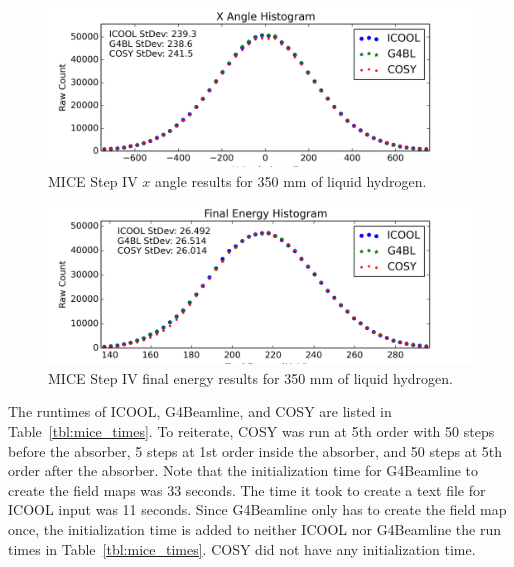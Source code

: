 \documentclass[a4paper,11pt]{article}
\begin{document}
\begin{figure}[htb]
  \centering
    \includegraphics[width=\columnwidth]{Figures/px} 
  \caption{MICE Step IV $x$ angle results for 350 mm of liquid hydrogen.}
  \label{fig:micexangle}
\end{figure}

\begin{figure}[htb]
  \centering
    \includegraphics[width=\columnwidth]{Figures/e} 
  \caption{MICE Step IV final energy results for 350 mm of liquid hydrogen.}
  \label{fig:miceenergy}
\end{figure}

The runtimes of ICOOL, G4Beamline, and COSY are listed in Table~\ref{tbl:mice_times}. To reiterate, COSY was run at 5th order with 50 steps before the absorber, 5 steps at 1st order inside the absorber, and 50 steps at 5th order after the absorber. Note that the initialization time for G4Beamline to create the field maps was 33 seconds. The time it took to create a text file for ICOOL input was 11 seconds. Since G4Beamline only has to create the field map once, the initialization time is added to neither ICOOL nor G4Beamline the run times in Table~\ref{tbl:mice_times}. COSY did not have any initialization time.
\end{document}
